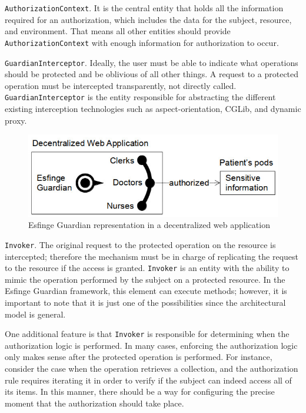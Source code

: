 \documentclass[sigconf]{acmart}
\begin{document}
\noindent \verb|AuthorizationContext|. It is the central entity that holds all the information required for an authorization, which includes the data for the subject, resource, and environment. That means all other entities should provide \verb|AuthorizationContext| with enough information for authorization to occur.

\noindent \verb|GuardianInterceptor|.
Ideally, the user must be able to indicate what operations should be protected and be oblivious of all other things. A request to a protected operation must be intercepted transparently, not directly called. \verb|GuardianInterceptor| is the entity responsible for abstracting the different existing interception technologies such as aspect-orientation, CGLib, and dynamic proxy.

\begin{figure}
  \centering
  \includegraphics[scale=0.5]{guardian-in-decentralized-webapp.jpg}
  \caption{Esfinge Guardian representation in a decentralized web application}
  \label{fig:guardian-in-decentralized-webapp}
\end{figure}

\noindent \verb|Invoker|.
The original request to the protected operation on the resource is intercepted; therefore the mechanism must be in charge of replicating the request to the resource if the access is granted. \verb|Invoker| is an entity with the ability to mimic the operation performed by the subject on a protected resource. In the Esfinge Guardian framework, this element can execute methods; however, it is important to note that it is just one of the possibilities since the architectural model is general.

One additional feature is that \verb|Invoker| is responsible for determining when the authorization logic is performed. In many cases, enforcing the authorization logic only makes sense after the protected operation is performed. For instance, consider the case when the operation retrieves a collection, and the authorization rule requires iterating it in order to verify if the subject can indeed access all of its items. In this manner, there should be a way for configuring the precise moment that the authorization should take place.
\end{document}

